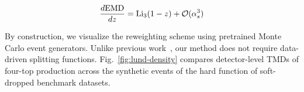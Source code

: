 \begin{equation}
  \frac{d \mathrm{EMD}}{d z} = \mathrm{Li}_{3}(1 - z) + \mathcal{O}(\alpha_s^{3})
  \label{eq:2}
\end{equation}

By construction, we visualize the reweighting scheme using pretrained
Monte Carlo event generators. Unlike previous
work~\cite{TPC:1629-The-Soft-Anomalous-Dimension-of-Sudakov-Safe-Rapidity-Divergences-Beyond-Next-to-Leading-Power-September-23-2026},
our method does not require data-driven splitting functions.
Fig.~\ref{fig:lund-density} compares detector-level TMDs of four-top
production across the synthetic events of the hard function of
soft-dropped benchmark datasets.

